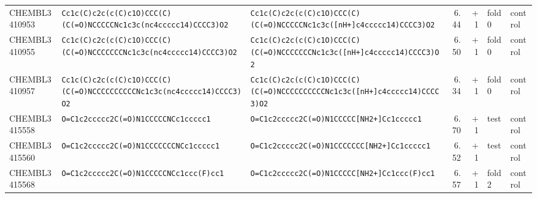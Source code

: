 \begin{longtable}{l p{4.4cm} p{4.4cm} r r l l}
CHEMBL3410953 & \texttt{Cc1c(\allowbreak{}C)\allowbreak{}c2c(\allowbreak{}c(\allowbreak{}C)\allowbreak{}c1O)\allowbreak{}CCC(\allowbreak{}C)\allowbreak{}(\allowbreak{}C(\allowbreak{}=\allowbreak{}O)\allowbreak{}NCCCCCNc1c3c(\allowbreak{}nc4ccccc14)\allowbreak{}CCCC3)\allowbreak{}O2} & \texttt{Cc1c(\allowbreak{}C)\allowbreak{}c2c(\allowbreak{}c(\allowbreak{}C)\allowbreak{}c1O)\allowbreak{}CCC(\allowbreak{}C)\allowbreak{}(\allowbreak{}C(\allowbreak{}=\allowbreak{}O)\allowbreak{}NCCCCCNc1c3c(\allowbreak{}[nH+]\allowbreak{}c4ccccc14)\allowbreak{}CCCC3)\allowbreak{}O2} & 6.44 & +1 & fold 0 & control \\
CHEMBL3410955 & \texttt{Cc1c(\allowbreak{}C)\allowbreak{}c2c(\allowbreak{}c(\allowbreak{}C)\allowbreak{}c1O)\allowbreak{}CCC(\allowbreak{}C)\allowbreak{}(\allowbreak{}C(\allowbreak{}=\allowbreak{}O)\allowbreak{}NCCCCCCCNc1c3c(\allowbreak{}nc4ccccc14)\allowbreak{}CCCC3)\allowbreak{}O2} & \texttt{Cc1c(\allowbreak{}C)\allowbreak{}c2c(\allowbreak{}c(\allowbreak{}C)\allowbreak{}c1O)\allowbreak{}CCC(\allowbreak{}C)\allowbreak{}(\allowbreak{}C(\allowbreak{}=\allowbreak{}O)\allowbreak{}NCCCCCCCNc1c3c(\allowbreak{}[nH+]\allowbreak{}c4ccccc14)\allowbreak{}CCCC3)\allowbreak{}O2} & 6.50 & +1 & fold 0 & control \\
CHEMBL3410957 & \texttt{Cc1c(\allowbreak{}C)\allowbreak{}c2c(\allowbreak{}c(\allowbreak{}C)\allowbreak{}c1O)\allowbreak{}CCC(\allowbreak{}C)\allowbreak{}(\allowbreak{}C(\allowbreak{}=\allowbreak{}O)\allowbreak{}NCCCCCCCCCCNc1c3c(\allowbreak{}nc4ccccc14)\allowbreak{}CCCC3)\allowbreak{}O2} & \texttt{Cc1c(\allowbreak{}C)\allowbreak{}c2c(\allowbreak{}c(\allowbreak{}C)\allowbreak{}c1O)\allowbreak{}CCC(\allowbreak{}C)\allowbreak{}(\allowbreak{}C(\allowbreak{}=\allowbreak{}O)\allowbreak{}NCCCCCCCCCCNc1c3c(\allowbreak{}[nH+]\allowbreak{}c4ccccc14)\allowbreak{}CCCC3)\allowbreak{}O2} & 6.34 & +1 & fold 0 & control \\
CHEMBL3415558 & \texttt{O=\allowbreak{}C1c2ccccc2C(\allowbreak{}=\allowbreak{}O)\allowbreak{}N1CCCCCNCc1ccccc1} & \texttt{O=\allowbreak{}C1c2ccccc2C(\allowbreak{}=\allowbreak{}O)\allowbreak{}N1CCCCC[NH2+]\allowbreak{}Cc1ccccc1} & 6.70 & +1 & test & control \\
CHEMBL3415560 & \texttt{O=\allowbreak{}C1c2ccccc2C(\allowbreak{}=\allowbreak{}O)\allowbreak{}N1CCCCCCCNCc1ccccc1} & \texttt{O=\allowbreak{}C1c2ccccc2C(\allowbreak{}=\allowbreak{}O)\allowbreak{}N1CCCCCCC[NH2+]\allowbreak{}Cc1ccccc1} & 6.52 & +1 & test & control \\
CHEMBL3415568 & \texttt{O=\allowbreak{}C1c2ccccc2C(\allowbreak{}=\allowbreak{}O)\allowbreak{}N1CCCCCNCc1ccc(\allowbreak{}F)\allowbreak{}cc1} & \texttt{O=\allowbreak{}C1c2ccccc2C(\allowbreak{}=\allowbreak{}O)\allowbreak{}N1CCCCC[NH2+]\allowbreak{}Cc1ccc(\allowbreak{}F)\allowbreak{}cc1} & 6.57 & +1 & fold 2 & control \\

\end{longtable}
